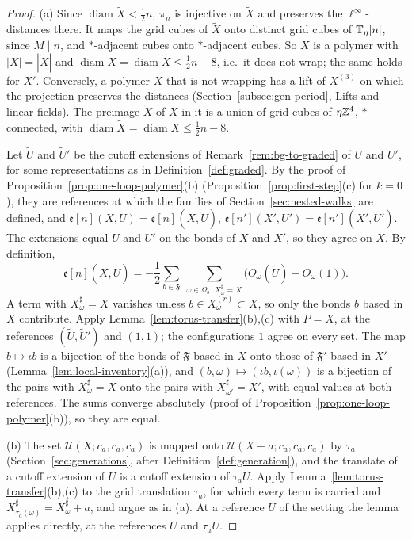 \begin{proof}
(a) Since $\operatorname{diam}\tilde X<\frac12n$, $\pi_n$ is injective on $\tilde X$ and preserves the $\ell^\infty$-distances there. It maps the grid cubes of $\tilde X$ onto distinct grid cubes of $\mathbb T_\eta[n]$, since $M\mid n$, and $*$-adjacent cubes onto $*$-adjacent cubes. So $X$ is a polymer with $|X|=|\tilde X|$ and $\operatorname{diam}X=\operatorname{diam}\tilde X\le\frac12n-8$, i.e.\ it does not wrap; the same holds for $X'$. Conversely, a polymer $X$ that is not wrapping has a lift of $X^{(3)}$ on which the projection preserves the distances (Section~\ref{subsec:gen-period}, Lifts and linear fields). The preimage $\tilde X$ of $X$ in it is a union of grid cubes of $\eta\mathbb Z^4$, $*$-connected, with $\operatorname{diam}\tilde X=\operatorname{diam}X\le\frac12n-8$.

Let $\tilde U$ and $\tilde U'$ be the cutoff extensions of Remark~\ref{rem:bg-to-graded} of $U$ and $U'$, for some representations as in Definition~\ref{def:graded}. By the proof of Proposition~\ref{prop:one-loop-polymer}(b) (Proposition~\ref{prop:first-step}(c) for $k=0$), they are references at which the families of Section~\ref{sec:nested-walks} are defined, and $\mathfrak e[n](X,U)=\mathfrak e[n](X,\tilde U)$, $\mathfrak e[n'](X',U')=\mathfrak e[n'](X',\tilde U')$. The extensions equal $U$ and $U'$ on the bonds of $X$ and $X'$, so they agree on $X$. By definition,
\[
\mathfrak e[n](X,\tilde U)=-\frac12\sum_{b\in\mathfrak F}\ \sum_{\omega\in\Omega_b:\,X^\sharp_\omega=X}\big(O_\omega(\tilde U)-O_\omega(1)\big).
\]
A term with $X^\sharp_\omega=X$ vanishes unless $b\in X^{(r)}_\omega\subset X$, so only the bonds $b$ based in $X$ contribute. Apply Lemma~\ref{lem:torus-transfer}(b),(c) with $P=X$, at the references $(\tilde U,\tilde U')$ and $(1,1)$; the configurations $1$ agree on every set. The map $b\mapsto\iota b$ is a bijection of the bonds of $\mathfrak F$ based in $X$ onto those of $\mathfrak F'$ based in $X'$ (Lemma~\ref{lem:local-inventory}(a)), and $(b,\omega)\mapsto(\iota b,\iota(\omega))$ is a bijection of the pairs with $X^\sharp_\omega=X$ onto the pairs with $X^\sharp_{\omega'}=X'$, with equal values at both references. The sums converge absolutely (proof of Proposition~\ref{prop:one-loop-polymer}(b)), so they are equal.

(b) The set $\mathcal U(X;c_a,c_a,c_a)$ is mapped onto $\mathcal U(X+a;c_a,c_a,c_a)$ by $\tau_a$ (Section~\ref{sec:generations}, after Definition~\ref{def:generation}), and the translate of a cutoff extension of $U$ is a cutoff extension of $\tau_aU$. Apply Lemma~\ref{lem:torus-transfer}(b),(c) to the grid translation $\tau_a$, for which every term is carried and $X^\sharp_{\tau_a(\omega)}=X^\sharp_\omega+a$, and argue as in (a). At a reference $U$ of the setting the lemma applies directly, at the references $U$ and $\tau_aU$.


\end{proof}

